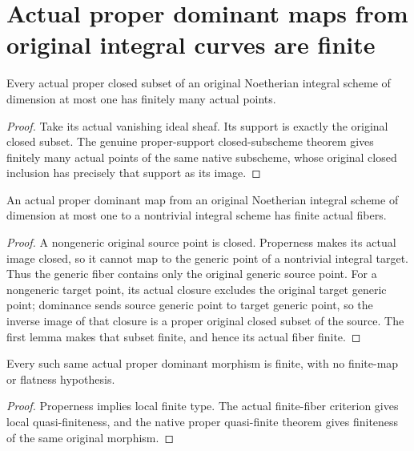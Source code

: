 \section{Actual proper dominant maps from original integral curves are finite}
\begin{lemma}\label{lem:curve-proper-closed-subset-finite}
Every actual proper closed subset of an original Noetherian integral scheme of dimension at most one has finitely many actual points.
\leanok
\end{lemma}
\begin{proof}
Take its actual vanishing ideal sheaf. Its support is exactly the original closed subset. The genuine proper-support closed-subscheme theorem gives finitely many actual points of the same native subscheme, whose original closed inclusion has precisely that support as its image.
\end{proof}
\begin{lemma}\label{lem:curve-proper-dominant-fibers-finite}
An actual proper dominant map from an original Noetherian integral scheme of dimension at most one to a nontrivial integral scheme has finite actual fibers.
\leanok
\end{lemma}
\begin{proof}
A nongeneric original source point is closed. Properness makes its actual image closed, so it cannot map to the generic point of a nontrivial integral target. Thus the generic fiber contains only the original generic source point. For a nongeneric target point, its actual closure excludes the original target generic point; dominance sends source generic point to target generic point, so the inverse image of that closure is a proper original closed subset of the source. The first lemma makes that subset finite, and hence its actual fiber finite.
\end{proof}
\begin{theorem}\label{thm:curve-proper-dominant-finite}
Every such same actual proper dominant morphism is finite, with no finite-map or flatness hypothesis.
\leanok
\end{theorem}
\begin{proof}
Properness implies local finite type. The actual finite-fiber criterion gives local quasi-finiteness, and the native proper quasi-finite theorem gives finiteness of the same original morphism.
\end{proof}
